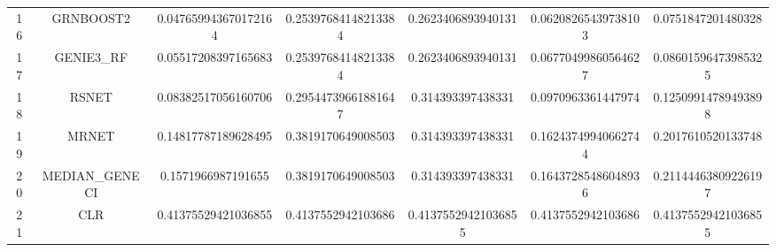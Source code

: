 \documentclass[a4paper,10pt]{article}
\begin{document}
\begin{landscape}
\begin{table}[!htp]
\begin{tabular}{ccccccc}
16&GRNBOOST2&0.047659943670172164&0.25397684148213384&0.2623406893940131&0.06208265439738103&0.0751847201480328\\
17&GENIE3_RF&0.05517208397165683&0.25397684148213384&0.2623406893940131&0.06770499860564627&0.08601596473985325\\
18&RSNET&0.08382517056160706&0.29544739661881647&0.314393397438331&0.0970963361447974&0.12509914789493898\\
19&MRNET&0.14817787189628495&0.3819170649008503&0.314393397438331&0.16243749940662744&0.2017610520133748\\
20&MEDIAN_GENECI&0.1571966987191655&0.3819170649008503&0.314393397438331&0.16437285486048936&0.21144463809226197\\
21&CLR&0.41375529421036855&0.4137552942103686&0.41375529421036855&0.4137552942103686&0.41375529421036855\\
\hline
\end{tabular}
\end{table}


\newpage


\end{landscape}
\end{document}
